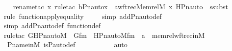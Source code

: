 \begin{isabellebody}
%
\isadelimproof
\isanewline
\ \ %
\endisadelimproof
%
\isatagproof
{}\isamarkupfalse%
{\isacharparenleft}{\kern0pt}rename{\isacharunderscore}{\kern0pt}tac\ x{\isacharcomma}{\kern0pt}\ rule{\isacharunderscore}{\kern0pt}tac\ b{\isacharequal}{\kern0pt}{\isachardoublequoteopen}Pn{\isacharunderscore}{\kern0pt}auto{\isacharparenleft}{\kern0pt}{\isasympi}{\isacharparenright}{\kern0pt}{\isacharbackquote}{\kern0pt}x{\isachardoublequoteclose}\ \ a{\isacharequal}{\kern0pt}{\isachardoublequoteopen}wftrec{\isacharparenleft}{\kern0pt}Memrel{\isacharparenleft}{\kern0pt}M{\isacharparenright}{\kern0pt}{\isacharcircum}{\kern0pt}{\isacharplus}{\kern0pt}{\isacharcomma}{\kern0pt}\ x{\isacharcomma}{\kern0pt}\ HPn{\isacharunderscore}{\kern0pt}auto{\isacharparenleft}{\kern0pt}{\isasympi}{\isacharparenright}{\kern0pt}{\isacharparenright}{\kern0pt}{\isachardoublequoteclose}\ \ ssubst{\isacharparenright}{\kern0pt}\isanewline
\ \ \ \isamarkupfalse%
{\isacharparenleft}{\kern0pt}rule\ function{\isacharunderscore}{\kern0pt}apply{\isacharunderscore}{\kern0pt}equality{\isacharparenright}{\kern0pt}\isanewline
\ \ \ \ \isamarkupfalse%
{\isacharparenleft}{\kern0pt}simp\ add{\isacharcolon}{\kern0pt}Pn{\isacharunderscore}{\kern0pt}auto{\isacharunderscore}{\kern0pt}def{\isacharparenright}{\kern0pt}\isanewline
\ \ \ \isamarkupfalse%
{\isacharparenleft}{\kern0pt}simp\ add{\isacharcolon}{\kern0pt}Pn{\isacharunderscore}{\kern0pt}auto{\isacharunderscore}{\kern0pt}def\ function{\isacharunderscore}{\kern0pt}def{\isacharparenright}{\kern0pt}\isanewline
\ \ \isamarkupfalse%
{\isacharparenleft}{\kern0pt}rule{\isacharunderscore}{\kern0pt}tac\ G{\isacharequal}{\kern0pt}HPn{\isacharunderscore}{\kern0pt}auto{\isacharunderscore}{\kern0pt}M\ \ Gfm\ {\isacharequal}{\kern0pt}\ HPn{\isacharunderscore}{\kern0pt}auto{\isacharunderscore}{\kern0pt}M{\isacharunderscore}{\kern0pt}fm{\isacharprime}{\kern0pt}\ \ a{\isacharequal}{\kern0pt}{\isasympi}\ \ memrel{\isacharunderscore}{\kern0pt}wftrec{\isacharunderscore}{\kern0pt}in{\isacharunderscore}{\kern0pt}M{\isacharparenright}{\kern0pt}\isanewline
\ \ \isamarkupfalse%
\ P{\isacharunderscore}{\kern0pt}name{\isacharunderscore}{\kern0pt}in{\isacharunderscore}{\kern0pt}M\ is{\isacharunderscore}{\kern0pt}P{\isacharunderscore}{\kern0pt}auto{\isacharunderscore}{\kern0pt}def\ \isanewline
\ \ \ \ \ \ \ \ \isamarkupfalse%
\ auto{\isacharbrackleft}{\kern0pt}{}{\isacharbrackright}{\kern0pt}\isanewline

\end{isabellebody}
